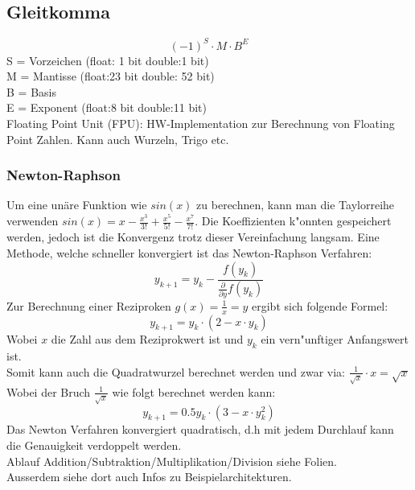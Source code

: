 \subsection{Gleitkomma}
\begin{equation}
(-1)^S\cdot M \cdot B^E
\end{equation}
S = Vorzeichen (float: 1 bit double:1 bit)\\
M = Mantisse (float:23 bit double: 52 bit)\\
B = Basis \\
E = Exponent (float:8 bit double:11 bit)\\

Floating Point Unit (FPU): HW-Implementation zur Berechnung von Floating Point Zahlen. Kann auch Wurzeln, Trigo etc.\\

\subsubsection{Newton-Raphson}
Um eine unäre Funktion wie $sin(x)$ zu berechnen, kann man die Taylorreihe verwenden $sin(x) = x - \frac{x^3}{3!} + \frac{x^5}{5!} - \frac{x^7}{7!}$. Die Koeffizienten k"onnten gespeichert werden, jedoch ist die Konvergenz trotz dieser Vereinfachung langsam. 
Eine Methode, welche schneller konvergiert ist das Newton-Raphson Verfahren: 
\begin{equation}
y_{k+1} = y_k - \frac{f(y_k)}{\frac{\partial}{\partial y}f(y_k)}
\end{equation}
Zur Berechnung einer Reziproken $g(x)=\frac{1}{x}=y$ ergibt sich folgende Formel: 
\begin{equation}
y_{k+1} = y_k\cdot (2-x\cdot y_k)
\end{equation}
Wobei $x$ die Zahl aus dem Reziprokwert ist und $y_k$ ein vern"unftiger Anfangswert ist. \\

Somit kann auch die Quadratwurzel berechnet werden und zwar via: $\frac{1}{\sqrt{x}} \cdot x = \sqrt{x}$\\
Wobei der Bruch $\frac{1}{\sqrt{x}}$ wie folgt berechnet werden kann:
\begin{equation}
y_{k+1} = 0.5y_k\cdot (3-x\cdot y_k^2)
\end{equation}
Das Newton Verfahren konvergiert quadratisch, d.h mit jedem Durchlauf kann die Genauigkeit verdoppelt werden.\\
Ablauf Addition/Subtraktion/Multiplikation/Division siehe Folien.\\
Ausserdem siehe dort auch Infos zu Beispielarchitekturen.

